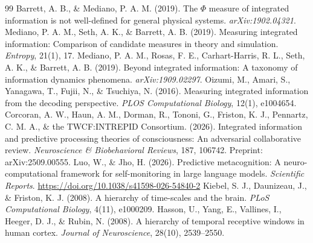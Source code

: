 \documentclass[11pt]{article}
\begin{document}
\begin{thebibliography}{99}
 Barrett, A. B., \& Mediano, P. A. M. (2019). The $\Phi$ measure of integrated information is not well-defined for general physical systems. \emph{arXiv:1902.04321}.
 Mediano, P. A. M., Seth, A. K., \& Barrett, A. B. (2019). Measuring integrated information: Comparison of candidate measures in theory and simulation. \emph{Entropy}, 21(1), 17.
 Mediano, P. A. M., Rosas, F. E., Carhart-Harris, R. L., Seth, A. K., \& Barrett, A. B. (2019). Beyond integrated information: A taxonomy of information dynamics phenomena. \emph{arXiv:1909.02297}.
 Oizumi, M., Amari, S., Yanagawa, T., Fujii, N., \& Tsuchiya, N. (2016). Measuring integrated information from the decoding perspective. \emph{PLOS Computational Biology}, 12(1), e1004654.
 Corcoran, A. W., Haun, A. M., Dorman, R., Tononi, G., Friston, K. J., Pennartz, C. M. A., \& the TWCF:INTREPID Consortium. (2026). Integrated information and predictive processing theories of consciousness: An adversarial collaborative review. \emph{Neuroscience \& Biobehavioral Reviews}, 187, 106742. Preprint: arXiv:2509.00555.
 Luo, W., \& Jho, H. (2026). Predictive metacognition: A neuro-computational framework for self-monitoring in large language models. \emph{Scientific Reports}. \url{https://doi.org/10.1038/s41598-026-54840-2}
 Kiebel, S. J., Daunizeau, J., \& Friston, K. J. (2008). A hierarchy of time-scales and the brain. \emph{PLoS Computational Biology}, 4(11), e1000209.
 Hasson, U., Yang, E., Vallines, I., Heeger, D. J., \& Rubin, N. (2008). A hierarchy of temporal receptive windows in human cortex. \emph{Journal of Neuroscience}, 28(10), 2539--2550.
\end{thebibliography}
\end{document}
